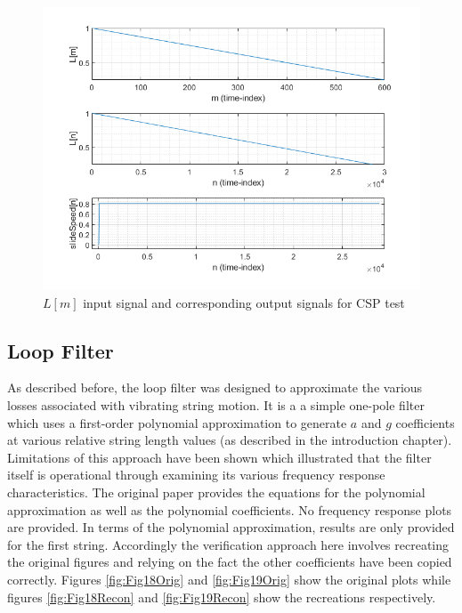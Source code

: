 \documentclass[../main.tex]{subfiles}
\begin{document}
\begin{figure}[h]
    \centering
    \includegraphics[scale=.65]{./images/plots/CSPTest.png}
    \caption{$L[m]$ input signal and corresponding output signals for CSP test}
    \label{fig:CSPTest}
\end{figure}

\subsection{Loop Filter}
As described before, the loop filter was designed to approximate the various losses associated with vibrating string motion. It is a a simple one-pole filter which uses a first-order polynomial approximation to generate $a$ and $g$ coefficients at various relative string length values (as described in the introduction chapter). Limitations of this approach have been shown which illustrated that the filter itself is operational through examining its various frequency response characteristics. The original paper provides the equations for the polynomial approximation as well as the polynomial coefficients. No frequency response plots are provided. In terms of the polynomial approximation, results are only provided for the first string. Accordingly the verification approach here involves recreating the original figures and relying on the fact the other coefficients have been copied correctly. Figures \ref{fig:Fig18Orig} and \ref{fig:Fig19Orig} show the original plots while figures \ref{fig:Fig18Recon} and \ref{fig:Fig19Recon} show the recreations respectively.
\end{document}
